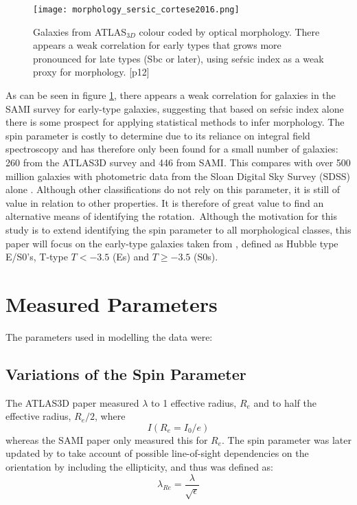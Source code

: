 \begin{figure}[h]
	\caption{Galaxies from ATLAS$_{3D}$ colour coded by optical morphology. There appears a weak correlation for early types that grows more pronounced for late types (Sbc or later), using se\'rsic index as a weak proxy for morphology.	
		\cite{Cortese2016}[p12]}
	\centering
	\texttt{[image: morphology\_sersic\_cortese2016.png]}
	\label{fig:morphologysersic}
\end{figure}
As can be seen in figure \ref{fig:morphologysersic}, there appears a weak correlation for galaxies in the SAMI survey for early-type galaxies, suggesting that based on se\'rsic index alone there is some prospect for applying statistical methods to infer morphology.
The spin parameter is costly to determine due to its reliance on integral field spectroscopy and has therefore only been found for a small number of galaxies: 260 from the ATLAS3D survey and 446 from SAMI. This compares with over 500 million galaxies with photometric data from the Sloan Digital Sky Survey (SDSS) alone \cite{SDSS}. Although other classifications do not rely on this parameter, it is still of value in relation to other properties. It is therefore of great value to find an alternative means of identifying the rotation.\
Although the motivation for this study is to extend identifying the spin parameter to all morphological classes, this paper will focus on the early-type galaxies taken from \cite{Emsellem2011}, defined as Hubble type E/S0's, T-type $T < −3.5$ (Es) and $T \geq −3.5$ (S0s).
\section{Measured Parameters}
The parameters used in modelling the data were:
\subsection{Variations of the Spin Parameter}
The ATLAS3D paper measured $\lambda$ to 1 effective radius, $R_{e}$ and to half the effective radius, $R_{e}/2$, where 
\begin{equation}
I(R_{e}=I_{0}/e)
\end{equation}
whereas the SAMI paper only measured this for $R_{e}$\cite[p.~3]{Cortese2016}. The spin parameter was later updated by \cite{Cappellari2011} to take account of possible line-of-sight dependencies on the orientation by including the ellipticity, and thus was defined as:
\begin{equation}
\lambda_{Re} = \frac{\lambda}{\sqrt{\epsilon}}
\end{equation}
